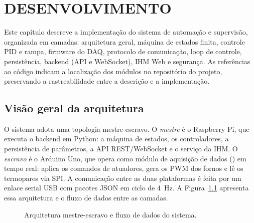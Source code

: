\chapter{DESENVOLVIMENTO}

Este capítulo descreve a implementação do sistema de automação e supervisão,
organizada em camadas: arquitetura geral, máquina de estados finita, controle
PID e rampa, firmware do DAQ, protocolo de comunicação, loop de controle,
persistência, backend (API e WebSocket), IHM Web e segurança. As referências ao
código indicam a localização dos módulos no repositório do projeto, preservando
a rastreabilidade entre a descrição e a implementação.

\section{Visão geral da arquitetura}

O sistema adota uma topologia mestre-escravo. O \emph{mestre} é o Raspberry Pi,
que executa o backend em Python: a máquina de estados, os controladores, a
persistência de parâmetros, a API REST/WebSocket e o serviço da IHM. O
\emph{escravo} é o Arduino Uno, que opera como módulo de aquisição de dados
(\daq) em tempo real: aplica os comandos de atuadores, gera os PWM dos fornos e
lê os termopares via SPI. A comunicação entre as duas plataformas é feita por um
enlace serial USB com pacotes JSON em ciclo de 4~Hz. A Figura~\ref{fig:arq}
apresenta essa arquitetura e o fluxo de dados entre as camadas.

\begin{figure}[htbp]
\centering
{}
\caption{Arquitetura mestre-escravo e fluxo de dados do sistema.}
\label{fig:arq}
\par{}
\end{figure}

